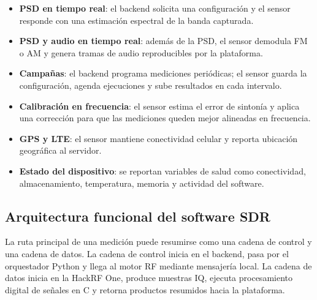 \begin{itemize}
  \item \textbf{PSD en tiempo real}: el backend solicita una configuración y el
  sensor responde con una estimación espectral de la banda capturada.

  \item \textbf{PSD y audio en tiempo real}: además de la PSD, el sensor demodula
  FM o AM y genera tramas de audio reproducibles por la plataforma.

  \item \textbf{Campañas}: el backend programa mediciones periódicas; el sensor
  guarda la configuración, agenda ejecuciones y sube resultados en cada
  intervalo.

  \item \textbf{Calibración en frecuencia}: el sensor estima el error de sintonía
  y aplica una corrección para que las mediciones queden mejor alineadas en
  frecuencia.

  \item \textbf{GPS y LTE}: el sensor mantiene conectividad celular y reporta
  ubicación geográfica al servidor.

  \item \textbf{Estado del dispositivo}: se reportan variables de salud como
  conectividad, almacenamiento, temperatura, memoria y actividad del software.
\end{itemize}

\subsection{Arquitectura funcional del software SDR}

La ruta principal de una medición puede resumirse como una cadena de control y una
cadena de datos. La cadena de control inicia en el backend, pasa por el
orquestador Python y llega al motor RF mediante mensajería local. La cadena de
datos inicia en la HackRF One, produce muestras IQ, ejecuta procesamiento digital
de señales en C y retorna productos resumidos hacia la plataforma.

